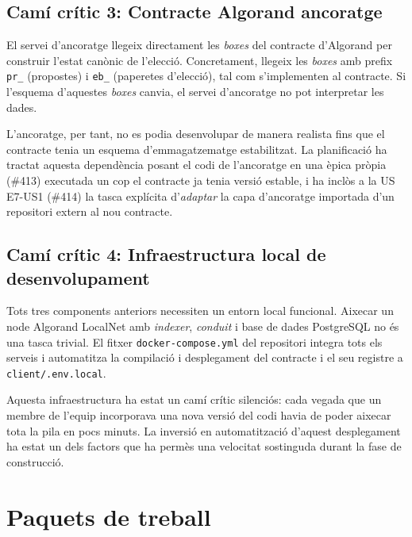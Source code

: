 \subsection{Camí crític 3: Contracte Algorand \textrightarrow{} ancoratge}
\label{subsec:cami-critic-3:-contracte-algorand-ancoratge}

El servei d'ancoratge llegeix directament les \emph{boxes} del contracte d'Algorand per construir l'estat canònic de
l'elecció.
Concretament, llegeix les \emph{boxes} amb prefix \texttt{pr\_} (propostes) i \texttt{eb\_} (paperetes d'elecció), tal
com s'implementen al contracte.
Si l'esquema d'aquestes \emph{boxes} canvia, el servei d'ancoratge no pot interpretar les dades.

L'ancoratge, per tant, no es podia desenvolupar de manera realista fins que el contracte tenia un esquema
d'emmagatzematge estabilitzat.
La planificació ha tractat aquesta dependència posant el codi de l'ancoratge en una èpica pròpia (\#413) executada un
cop el contracte ja tenia versió estable, i ha inclòs a la \ac{US} E7-\ac{US}1 (\#414) la tasca explícita
d'\emph{adaptar} la capa d'ancoratge importada d'un repositori extern al nou contracte.

\subsection{Camí crític 4: Infraestructura local de desenvolupament}
\label{subsec:cami-critic-4:-infraestructura-local-de-desenvolupament}

Tots tres components anteriors necessiten un entorn local funcional.
Aixecar un node Algorand LocalNet amb \emph{indexer}, \emph{conduit} i base de dades PostgreSQL no és una tasca trivial.
El fitxer \texttt{docker-compose.yml} del repositori integra tots els serveis i automatitza la compilació i desplegament
del contracte i el seu registre a \texttt{client/.env.local}.

Aquesta infraestructura ha estat un camí crític silenciós: cada vegada que un membre de l'equip incorporava una nova
versió del codi havia de poder aixecar tota la pila en pocs minuts.
La inversió en automatització d'aquest desplegament ha estat un dels factors que ha permès una velocitat sostinguda
durant la fase de construcció.



\section{Paquets de treball}
\label{sec:paquets-treball}

